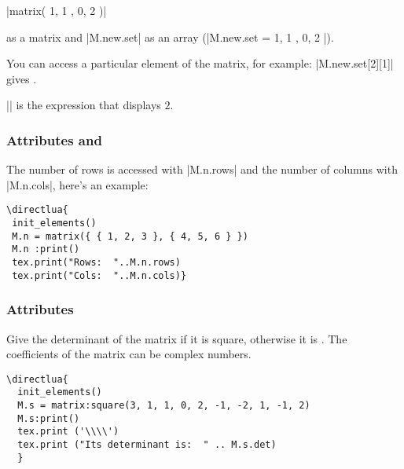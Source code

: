 |matrix({ { 1, 1 }, { 0, 2 } })|

 as a matrix and |M.new.set| as an array (|M.new.set = { { 1, 1 }, {0, 2 } }|).

You can access a particular element of the matrix, for example: |M.new.set[2][1]| gives .

|| is the expression that displays $2$.

\subsubsection{Attributes  and }
\label{ssub:attributes_matrix_rows_and_cols}

The number of rows is accessed with |M.n.rows| and the number of columns with |M.n.cols|, here's an example:

\vspace{.5em}
\begin{minipage}{.5\textwidth}
\begin{verbatim}
\directlua{
 init_elements()
 M.n = matrix({ { 1, 2, 3 }, { 4, 5, 6 } })
 M.n :print()
 tex.print("Rows:  "..M.n.rows)
 tex.print("Cols:  "..M.n.cols)}
\end{verbatim}
\end{minipage}
\begin{minipage}{.5\textwidth}
\end{minipage}

\subsubsection{Attributes  }
\label{ssub:attributes_matrix_det}
Give the determinant of the matrix if it is square, otherwise it is . The coefficients of the matrix can be complex numbers.

\vspace{.5em}
\begin{minipage}{.6\textwidth}
\begin{verbatim}
\directlua{
  init_elements()
  M.s = matrix:square(3, 1, 1, 0, 2, -1, -2, 1, -1, 2)
  M.s:print()
  tex.print ('\\\\')
  tex.print ("Its determinant is:  " .. M.s.det)
  }
\end{verbatim}
\end{minipage}
\begin{minipage}{.4\textwidth}
\end{minipage}

